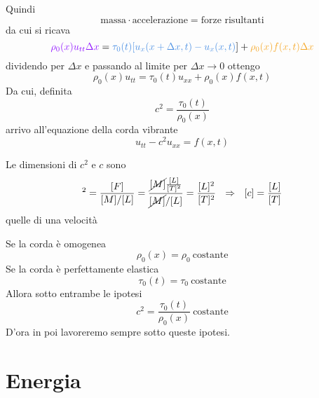 Quindi
\begin{equation*}
    \text{massa} \cdotp \text{accelerazione} =\text{forze risultanti}
\end{equation*}
da cui si ricava
\begin{equation*}
    \textcolor[rgb]{0.56,0.07,1}{\rho _{0}(x) u_{tt} \Delta x} =\textcolor[rgb]{0.29,0.56,0.89}{\tau _{0}(t)[u_{x}(x+\Delta x,t)-u_{x}(x,t)}] +\textcolor[rgb]{0.96,0.65,0.14}{\rho _{0}(x)f(x,t)\Delta x}
\end{equation*}
dividendo per $\displaystyle \Delta x$ e passando al limite per $\displaystyle \Delta x\rightarrow 0$ ottengo
\begin{equation*}
    \rho _{0}(x) u_{tt} =\tau _{0}(t) u_{xx} +\rho _{0} (x)f(x,t)
\end{equation*}
Da cui, definita
\begin{equation*}
    c^{2} =\frac{\tau _{0}(t)}{\rho _{0}(x)}
\end{equation*}
arrivo all'equazione della corda vibrante
\begin{equation}
    \boxed{u_{tt} -c^{2} u_{xx} =f(x,t)}
\end{equation}
\begin{nb}
    Le dimensioni di $\displaystyle c^{2}$ e $c$ sono
    \begin{equation*}
        [ c]^{2} =\frac{[ F]}{[ M] /[ L]} =\frac{\cancel{[ M]}\frac{[ L]}{[ T]^{2}}}{\cancel{[ M]} /[ L]} =\frac{[ L]^{2}}{[ T]^{2}} \ \ \Rightarrow \ \ [ c] =\frac{[ L]}{[ T]}
    \end{equation*}
    quelle di una velocità
\end{nb}
\begin{nb}
    Se la corda è omogenea
    \begin{equation*}
        \rho _{0}(x) =\rho _{0} \ \text{costante}
    \end{equation*}
    Se la corda è perfettamente elastica
    \begin{equation*}
        \tau _{0}(t) =\tau _{0} \ \text{costante}
    \end{equation*}
    Allora sotto entrambe le ipotesi
    \begin{equation*}
        c^{2} =\frac{\tau _{0}(t)}{\rho _{0}(x)} \ \text{costante}
    \end{equation*}
    D'ora in poi lavoreremo sempre sotto queste ipotesi.
\end{nb}
\section{Energia}

